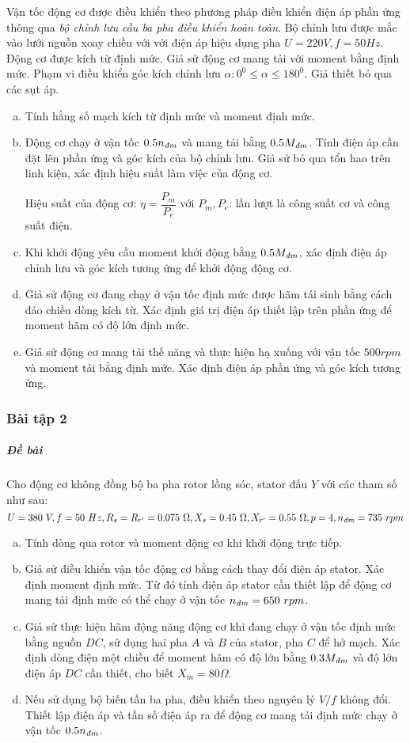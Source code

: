 \documentclass[12pt,a4paper]{article}
\begin{document}
Vận tốc động cơ được điều khiển theo phương pháp điều khiển điện áp phần ứng thông qua \textit{bộ chỉnh lưu cầu ba pha điều khiển hoàn toàn}. Bộ chỉnh lưu được mắc vào lưới nguồn xoay chiều với với điện áp hiệu dụng pha $U = 220 \unit{V}, f = 50 \unit{Hz}$. Động cơ được kích từ định mức. Giả sử động cơ mang tải với moment bằng định mức. Phạm vi điều khiển góc kích chỉnh lưu $\alpha: 0^0 \leq \alpha \leq  180^0$. Giả thiết bỏ qua các sụt áp.
\begin{enumerate}[a.]
\item Tính hằng số mạch kích từ định mức và moment định mức.
\item Động cơ chạy ở vận tốc $0.5 \vitalic{n}$ và mang tải bằng $0.5 \vitalic{M}$. Tính điện áp cần đặt lên phần ứng và góc kích của bộ chỉnh lưu. Giả sử bỏ qua tổn hao trên linh kiện, xác định hiệu suất làm việc của động cơ.

Hiệu suất của động cơ: $\eta = \dfrac{P_m}{P_e}$ với $P_m, P_e$: lần lượt là công suất cơ và công suất điện.
\item Khi khởi động yêu cầu moment khởi động bằng $0.5 \vitalic{M}$, xác định điện áp chỉnh lưu và góc kích tương ứng để khởi động động cơ.
\item Giả sử động cơ đang chạy ở vận tốc định mức được hãm tái sinh bằng cách đảo chiều dòng kích từ. Xác định giá trị điện áp thiết lập trên phần ứng để moment hãm có độ lớn định mức.
\item Giả sử động cơ mang tải thế năng và thực hiện hạ xuống với vận tốc $500 \unit{rpm}$ và moment tải bằng định mức. Xác định điện áp phần ứng và góc kích tương ứng.
\end{enumerate}
\subsubsection{Bài tập 2}
\subparagraph{Đề bài} Cho động cơ không đồng bộ ba pha rotor lồng sóc, stator đấu $Y$ với các tham số như sau: $$ U = 380 \unit{V}, f = 50 \unit{Hz}, R_s = R_{r^ \prime}  = 0.075 \unit{\Omega}, X_s = 0.45 \unit{\Omega}, X_{r^ \prime}  = 0.55 \unit{\Omega}, p = 4, \vitalic{n} = 735\unit{rpm}$$
\begin{enumerate}[a.]
\item Tính dòng qua rotor và moment động cơ khi khởi động trực tiếp.
\item Giả sử điều khiển vận tốc động cơ bằng cách thay đổi điện áp stator. Xác định moment định mức. Từ đó tính điện áp stator cần thiết lập để động cơ mang tải định mức có thể chạy ở vận tốc $\vitalic{n} = 650 \unit{rpm}$.
\item Giả sử thực hiện hãm động năng động cơ khi đang chạy ở vận tốc định mức bằng nguồn $DC$, sử dụng hai pha $A$ và $B$ của stator, pha $C$ để hở mạch. Xác định dòng điện một chiều để moment hãm có độ lớn bằng $0.3 \vitalic{M}$ và độ lớn điện áp $DC$ cần thiết, cho biết $X_m = 80 \unit{\Omega}$.
\item Nếu sử dụng bộ biến tần ba pha, điều khiển theo nguyên lý $V/f$ không đổi. Thiết lập điện áp và tần số điện áp ra để động cơ mang tải định mức chạy ở vận tốc  $0.5 \vitalic{n}$.
\end{enumerate}
\end{document}
